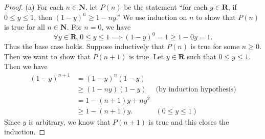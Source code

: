 \begin{proof}{(a)}
    For each \(n \in \mathbf{N}\), let \(P(n)\) be the statement ``for each \(y \in \mathbf{R}\), if \(0 \leq y \leq 1\), then \((1 - y)^n \geq 1 - ny\).''
    We use induction on \(n\) to show that \(P(n)\) is true for all \(n \in \mathbf{N}\).
    For \(n = 0\), we have
    \[
        \forall y \in \mathbf{R}, 0 \leq y \leq 1 \implies (1 - y)^0 = 1 \geq 1 - 0y = 1.
    \]
    Thus the base case holds.
    Suppose inductively that \(P(n)\) is true for some \(n \geq 0\).
    Then we want to show that \(P(n + 1)\) is true.
    Let \(y \in \mathbf{R}\) such that \(0 \leq y \leq 1\).
    Then we have
    \begin{align*}
        (1 - y)^{n + 1} & = (1 - y)^n (1 - y)                                       \\
                        & \geq (1 - ny) (1 - y)  & \text{(by induction hypothesis)} \\
                        & = 1 - (n + 1)y + n y^2                                    \\
                        & \geq 1 - (n + 1)y.     & (0 \leq y \leq 1)
    \end{align*}
    Since \(y\) is arbitrary, we know that \(P(n + 1)\) is true and this closes the induction.
\end{proof}

